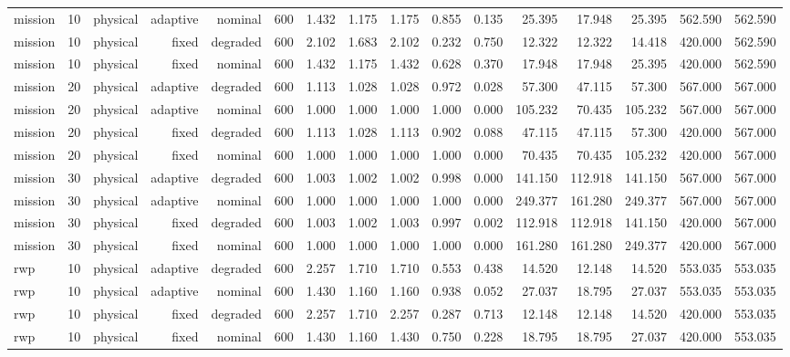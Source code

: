 \begin{tabular}{lrrrrrrrrrrrrrrr}
mission & 10 & physical & adaptive & nominal & 600 & 1.432 & 1.175 & 1.175 & 0.855 & 0.135 & 25.395 & 17.948 & 25.395 & 562.590 & 562.590 \\
mission & 10 & physical & fixed & degraded & 600 & 2.102 & 1.683 & 2.102 & 0.232 & 0.750 & 12.322 & 12.322 & 14.418 & 420.000 & 562.590 \\
mission & 10 & physical & fixed & nominal & 600 & 1.432 & 1.175 & 1.432 & 0.628 & 0.370 & 17.948 & 17.948 & 25.395 & 420.000 & 562.590 \\
mission & 20 & physical & adaptive & degraded & 600 & 1.113 & 1.028 & 1.028 & 0.972 & 0.028 & 57.300 & 47.115 & 57.300 & 567.000 & 567.000 \\
mission & 20 & physical & adaptive & nominal & 600 & 1.000 & 1.000 & 1.000 & 1.000 & 0.000 & 105.232 & 70.435 & 105.232 & 567.000 & 567.000 \\
mission & 20 & physical & fixed & degraded & 600 & 1.113 & 1.028 & 1.113 & 0.902 & 0.088 & 47.115 & 47.115 & 57.300 & 420.000 & 567.000 \\
mission & 20 & physical & fixed & nominal & 600 & 1.000 & 1.000 & 1.000 & 1.000 & 0.000 & 70.435 & 70.435 & 105.232 & 420.000 & 567.000 \\
mission & 30 & physical & adaptive & degraded & 600 & 1.003 & 1.002 & 1.002 & 0.998 & 0.000 & 141.150 & 112.918 & 141.150 & 567.000 & 567.000 \\
mission & 30 & physical & adaptive & nominal & 600 & 1.000 & 1.000 & 1.000 & 1.000 & 0.000 & 249.377 & 161.280 & 249.377 & 567.000 & 567.000 \\
mission & 30 & physical & fixed & degraded & 600 & 1.003 & 1.002 & 1.003 & 0.997 & 0.002 & 112.918 & 112.918 & 141.150 & 420.000 & 567.000 \\
mission & 30 & physical & fixed & nominal & 600 & 1.000 & 1.000 & 1.000 & 1.000 & 0.000 & 161.280 & 161.280 & 249.377 & 420.000 & 567.000 \\
rwp & 10 & physical & adaptive & degraded & 600 & 2.257 & 1.710 & 1.710 & 0.553 & 0.438 & 14.520 & 12.148 & 14.520 & 553.035 & 553.035 \\
rwp & 10 & physical & adaptive & nominal & 600 & 1.430 & 1.160 & 1.160 & 0.938 & 0.052 & 27.037 & 18.795 & 27.037 & 553.035 & 553.035 \\
rwp & 10 & physical & fixed & degraded & 600 & 2.257 & 1.710 & 2.257 & 0.287 & 0.713 & 12.148 & 12.148 & 14.520 & 420.000 & 553.035 \\
rwp & 10 & physical & fixed & nominal & 600 & 1.430 & 1.160 & 1.430 & 0.750 & 0.228 & 18.795 & 18.795 & 27.037 & 420.000 & 553.035 \\

\end{tabular}
